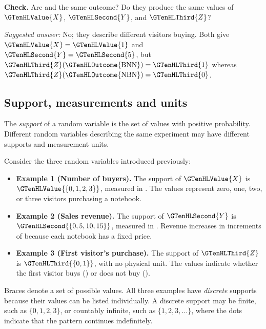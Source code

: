 \textbf{Check.} Are  and  the same outcome? Do they produce the same values of $\GTenHLValue{X}$, $\GTenHLSecond{Y}$, and $\GTenHLThird{Z}$?

\emph{Suggested answer:} No; they describe different visitors buying. Both give $\GTenHLValue{X}=\GTenHLValue{1}$ and $\GTenHLSecond{Y}=\GTenHLSecond{5}$, but $\GTenHLThird{Z}(\GTenHLOutcome{\mathrm{BNN}})=\GTenHLThird{1}$ whereas $\GTenHLThird{Z}(\GTenHLOutcome{\mathrm{NBN}})=\GTenHLThird{0}$.


\subsection{Support, measurements and units}
\label{subsec:t2-c1-support-measurements-and-units}

The \emph{support} of a random variable is the set of values with positive probability. Different random variables describing the same experiment may have different supports and measurement units.

Consider the three random variables introduced previously:

\begin{itemize}
	\item \textbf{Example 1 (Number of buyers).}
	The support of $\GTenHLValue{X}$ is $\GTenHLValue{\{0,1,2,3\}}$, measured in .
	The values represent zero, one, two, or three visitors
	purchasing a notebook.
	
	\item \textbf{Example 2 (Sales revenue).}
	The support of $\GTenHLSecond{Y}$ is $\GTenHLSecond{\{0,5,10,15\}}$, measured in .
	Revenue increases in increments of  because each
	notebook has a fixed price.
	
	\item \textbf{Example 3 (First visitor's purchase).}
	The support of $\GTenHLThird{Z}$ is $\GTenHLThird{\{0,1\}}$, with no physical unit.
	The values indicate whether the first visitor buys ()
	or does not buy ().
\end{itemize}

Braces denote a set of possible values. All three examples have \emph{discrete} supports because their values can be listed individually. A discrete support may be finite, such as $\{0,1,2,3\}$, or countably infinite, such as $\{1,2,3,\ldots\}$, where the dots indicate that the pattern continues indefinitely.


